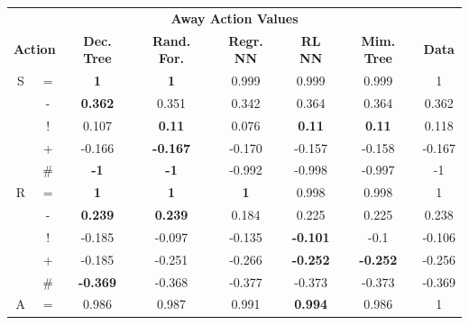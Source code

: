 \documentclass{sfuthesis}
\begin{document}
	\begin{table}
		\centering
		\begin{tabular}{cc|ccccc|c}
			\multicolumn{8}{c}{\textbf{Away Action Values}}                                                                                                                                \\
			\multicolumn{2}{c|}{\textbf{Action}} & \textbf{Dec. Tree} & \textbf{Rand. For.} & \textbf{Regr. NN} & \textbf{RL NN} & {\textbf{Mim. Tree}} & \textbf{Data} \\ \hline
			S      & =      & \textbf{1}                  & \textbf{1}                   & 0.999             & 0.999          & 0.999              & 1             \\
			& -      & \textbf{0.362}              & 0.351               & 0.342             & 0.364          & 0.364              & 0.362         \\
			& !      & 0.107              & \textbf{0.11}                & 0.076             & \textbf{0.11}           & \textbf{0.11}              & 0.118         \\
			& +      & -0.166             & \textbf{-0.167}              & -0.170            & -0.157         & -0.158             & -0.167        \\
			& \#     & \textbf{-1}                 & \textbf{-1}                  & -0.992            & -0.998         & -0.997             & -1            \\ \hline
			R      & =      &\textbf{ 1}                  & \textbf{1}                   & \textbf{1}                 & 0.998          & 0.998              & 1             \\
			& -      & \textbf{0.239}              & \textbf{0.239}               & 0.184             & 0.225          & 0.225              & 0.238         \\
			& !      & -0.185             & -0.097              & -0.135            & \textbf{-0.101}         & -0.1               & -0.106        \\
			& +      & -0.185             & -0.251              & -0.266            & \textbf{-0.252}         & \textbf{-0.252}             & -0.256        \\
			& \#     & \textbf{-0.369}             & -0.368              & -0.377            & -0.373         & -0.373             & -0.369        \\ \hline
			A      & =      & 0.986              & 0.987               & 0.991             & \textbf{0.994}          & 0.986              & 1             \\

\end{tabular}
\end{table}
\end{document}
